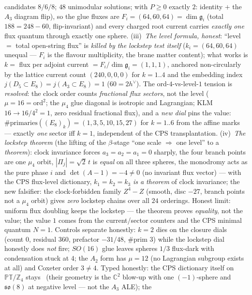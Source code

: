 \documentclass[11pt,a4paper]{article}
\newcommand{\Z}{\mathbb Z}
\begin{document}
\begin{itemize}
\begin{itemize}
candidates $8/6/8$; $48$ unimodular solutions; with $P\ge0$ exactly $2$: identity $+$ the $A_3$
diagram flip), so the glue fluxes are $F_i=(64,60,64)=\dim\mathfrak g_i$ (total $188=248-60$,
flip-invariant) and every charged root current carries \emph{exactly one} flux quantum through
exactly one sphere. (iii)~\emph{The level formula, honest}: ``level $=$ total open-string flux''
is \emph{killed by the lockstep test itself} ($k_i=(64,60,64)$ unequal --- $F_i$ is the flavour
multiplicity, the brane matter content); what works is $k=$ flux per adjoint current
$=F_i/\dim\mathfrak g_i=(1,1,1)$, anchored non-circularly by the lattice current count
$(240,0,0,0)$ for $k=1..4$ and the embedding index $j(D_5{\subset}E_8)=j(A_3{\subset}E_8)=1$
($60=2h^\vee$). The ord-$4$-vs-level-$1$ tension is \emph{resolved}: the clock order counts
\emph{fractional flux sectors}, not the level ($\mu=16=\mathrm{ord}^2$; the $\mu_4$ glue diagonal
is isotropic and Lagrangian; KLM $16\to16/4^2=1$, zero residual fractional flux), and a
\emph{new dial} pins the value: $\#\mathrm{primaries}((E_8)_k)=(1,3,5,10,15,27)$ for $k=1..6$
from the affine marks --- exactly \emph{one} sector iff $k=1$, independent of the CPS
transplantation. (iv)~\emph{The lockstep theorem} (the lifting of the $\beta$-stage ``one scale
$\Rightarrow$ one level'' to a \emph{theorem}): clock invariance forces $a_3=a_2=a_1=0$ sharply,
the four branch points are one $\mu_4$ orbit, $|\Pi_j|=\sqrt2\,t$ is \emph{equal} on all three
spheres, the monodromy acts as the pure phase $i$ and $\det(A-1)=-4\neq0$ (no invariant flux
vector) --- with the CPS flux-level dictionary, $k_1=k_2=k_3$ \emph{is a theorem} of clock
invariance; the new falsifier: the clock-forbidden family $Z^4-Z$ (smooth, disc $-27$, branch
points not a $\mu_4$ orbit) gives \emph{zero} lockstep chains over all $24$ orderings. Honest
limit: uniform flux doubling keeps the lockstep --- the theorem proves \emph{equality}, not the
value; the value $1$ comes from the current/sector counters and the CPS minimal quantum $N=1$.
Controls separate honestly: $k=2$ dies on the closure dials (count $0$, residual $360$,
prefactor $-31/48$, $\#$prim $3$) while the lockstep dial honestly does \emph{not} fire; $SO(16)$
glue leaves spheres $1/3$ flux-dark with condensation stuck at $4$; the $A_2$ form has $\mu=12$
(no Lagrangian subgroup exists at all) and Coxeter order $3\neq4$. Typed honestly: the CPS
dictionary itself on $\mathbb{PT}/\Z_4$ stays \mC\ (their geometry is the $\mathbb C^2$ blow-up
with one $(-1)$-sphere and $\mathfrak{so}(8)$ at negative level --- not the $A_3$ ALE); the

\end{itemize}
\end{itemize}
\end{document}
